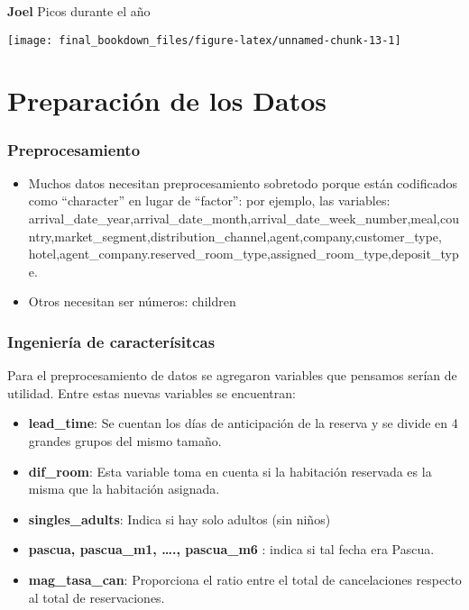 \documentclass[
]{book}
\begin{document}
\textbf{Joel} Picos durante el año

\begin{center}\texttt{[image: final\_bookdown\_files/figure-latex/unnamed-chunk-13-1]} \end{center}

\hypertarget{preparaciuxf3n-de-los-datos}{%
\chapter{Preparación de los Datos}\label{preparaciuxf3n-de-los-datos}}

\hypertarget{preprocesamiento}{%
\subsection{Preprocesamiento}\label{preprocesamiento}}

\begin{itemize}
\item
  Muchos datos necesitan preprocesamiento sobretodo porque están codificados como ``character'' en lugar de ``factor'': por ejemplo, las variables: arrival\_date\_year,arrival\_date\_month,arrival\_date\_week\_number,meal,country,market\_segment,distribution\_channel,agent,company,customer\_type, hotel,agent\_company.reserved\_room\_type,assigned\_room\_type,deposit\_type.
\item
  Otros necesitan ser números: children
\end{itemize}

\hypertarget{ingenieruxeda-de-caracteruxedsitcas}{%
\subsection{Ingeniería de caracterísitcas}\label{ingenieruxeda-de-caracteruxedsitcas}}

Para el preprocesamiento de datos se agregaron variables que pensamos serían de utilidad. Entre estas nuevas variables se encuentran:

\begin{itemize}
\item
  \textbf{lead\_time}: Se cuentan los días de anticipación de la reserva y se divide en 4 grandes grupos del mismo tamaño.
\item
  \textbf{dif\_room}: Esta variable toma en cuenta si la habitación reservada es la misma que la habitación asignada.
\item
  \textbf{singles\_adults}: Indica si hay solo adultos (sin niños)
\item
  \textbf{pascua, pascua\_m1, \ldots., pascua\_m6 }: indica si tal fecha era Pascua.
\item
  \textbf{mag\_tasa\_can}: Proporciona el ratio entre el total de cancelaciones respecto al total de reservaciones.
\end{itemize}
\end{document}
